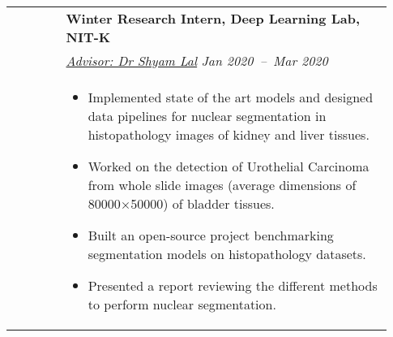 \documentclass[letterpaper, 10pt, oneside]{article}
\newcommand{\bdit}[1]{{\textbf{#1}}}
\begin{document}
\begin{longtable}{@{} p{0.13\linewidth} p{0.8\linewidth}}
                         & \bdit{Winter Research Intern, Deep Learning Lab, NIT-K}                                                                                                                                                                       \\
                         & \textsl{\href{https://ece.nitk.ac.in/faculty/shyam-lal}{Advisor: Dr Shyam Lal}} \hfill \hspace{-3em} \textsl{Jan 2020\ --\ Mar 2020}                                                                                          \\
                         & \parbox{0.8\textwidth}{                                                                                                                                                                                                       %
        \begin{itemize}[leftmargin=*, itemsep=-0.88ex, topsep=-0.88ex]
            \item Implemented state of the art models and designed data pipelines for nuclear segmentation in histopathology images of kidney and liver tissues.
            \item Worked on the detection of Urothelial Carcinoma from whole slide images (average dimensions of 80000$\times$50000) of bladder tissues.
            \item Built an open-source project benchmarking segmentation models on histopathology datasets.
            \item Presented a report reviewing the different methods to perform nuclear segmentation.
        \end{itemize}
    }
    \\
    \\


\end{longtable}
\end{document}
